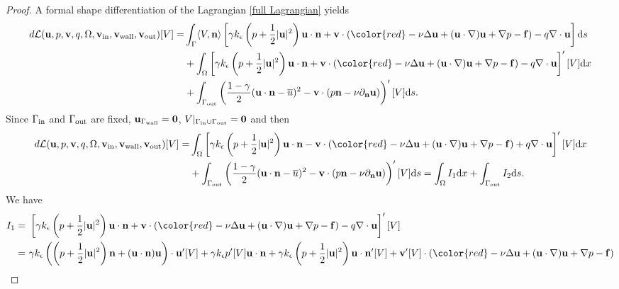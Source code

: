 \documentclass[oneside,11pt]{book}
\numberwithin{equation}{section}
\begin{document}
\begin{proof}
    A formal shape differentiation of the Lagrangian \eqref{full Lagrangian} yields
    \begin{align}
        d\mathcal{L}({\bf u},p,{\bf v},q,\Omega,{\bf v}_{\rm in},{\bf v}_{\rm wall},{\bf v}_{\rm out})[V] =& \int_\Gamma \langle V,{\bf n}\rangle\left[\gamma k_\epsilon\left(p + \frac{1}{2}|{\bf u}|^2\right){\bf u}\cdot{\bf n} + {\bf v}\cdot({\color{red} -\nu\Delta{\bf u} + ({\bf u}\cdot\nabla){\bf u} + \nabla p - {\bf f}}) - q\nabla\cdot{\bf u}\right]{\rm d}s\\
        &+ \int_\Omega \left[\gamma k_\epsilon\left(p + \frac{1}{2}|{\bf u}|^2\right){\bf u}\cdot{\bf n} + {\bf v}\cdot({\color{red} -\nu\Delta{\bf u} + ({\bf u}\cdot\nabla){\bf u} + \nabla p - {\bf f}}) - q\nabla\cdot{\bf u}\right]'[V]{\rm d}x\\
        &+ \int_{\Gamma_{\rm out}} \left(\frac{1 - \gamma}{2}({\bf u}\cdot{\bf n} - \overline{u})^2 - {\bf v}\cdot(p{\bf n} - \nu\partial_{\bf n}{\bf u})\right)'[V]{\rm d}s.
    \end{align}
    Since $\Gamma_{\rm in}$ and $\Gamma_{\rm out}$ are fixed, ${\bf u}_{\Gamma_{\rm wall}} = {\bf 0}$, $V|_{\Gamma_{\rm in}\cup\Gamma_{\rm out}} = {\bf 0}$ and then
    \begin{align}
        d\mathcal{L}({\bf u},p,{\bf v},q,\Omega,{\bf v}_{\rm in},{\bf v}_{\rm wall},{\bf v}_{\rm out})[V] =& \int_\Omega \left[\gamma k_\epsilon\left(p + \frac{1}{2}|{\bf u}|^2\right){\bf u}\cdot{\bf n} - {\bf v}\cdot({\color{red} -\nu\Delta{\bf u} + ({\bf u}\cdot\nabla){\bf u} + \nabla p - {\bf f}}) + q\nabla\cdot{\bf u}\right]'[V]{\rm d}x\\
        &+ \int_{\Gamma_{\rm out}} \left(\frac{1 - \gamma}{2}({\bf u}\cdot{\bf n} - \overline{u})^2 - {\bf v}\cdot(p{\bf n} - \nu\partial_{\bf n}{\bf u})\right)'[V]{\rm d}s = \int_\Omega I_1{\rm d}x + \int_{\Gamma_{\rm out}} I_2{\rm d}s. 
    \end{align}
    We have
    \begin{align}
        I_1 =&\ \left[\gamma k_\epsilon\left(p + \frac{1}{2}|{\bf u}|^2\right){\bf u}\cdot{\bf n} + {\bf v}\cdot({\color{red} -\nu\Delta{\bf u} + ({\bf u}\cdot\nabla){\bf u} + \nabla p - {\bf f}}) - q\nabla\cdot{\bf u}\right]'[V]\\
        =&\ \gamma k_\epsilon\left(\left(p + \frac{1}{2}|{\bf u}|^2\right){\bf n} + ({\bf u}\cdot{\bf n}){\bf u}\right)\cdot{\bf u}'[V] + \gamma k_\epsilon p'[V]{\bf u}\cdot{\bf n} + \gamma k_\epsilon\left(p + \frac{1}{2}|{\bf u}|^2\right){\bf u}\cdot{\bf n}'[V] + {\bf v}'[V]\cdot({\color{red} -\nu\Delta{\bf u} + ({\bf u}\cdot\nabla){\bf u} + \nabla p - {\bf f}}) \\

\end{align}
\end{proof}
\end{document}
